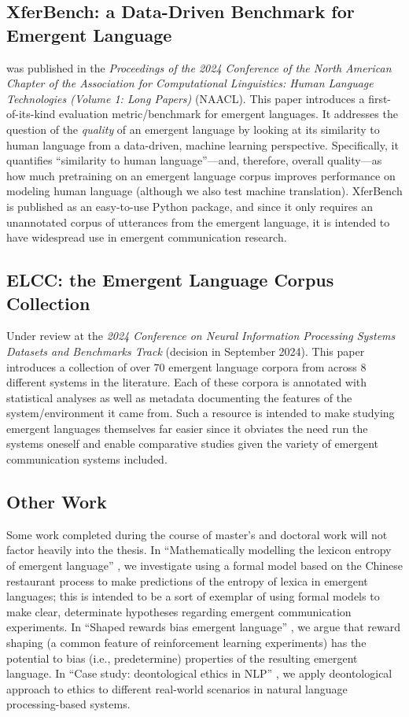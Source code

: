\subsection{XferBench: a Data-Driven Benchmark for Emergent Language}
\noindent
\citet{boldt2024xferbench} was published in the \textit{Proceedings of the 2024 Conference of the North American Chapter of the Association for Computational Linguistics: Human Language Technologies (Volume 1: Long Papers)} (NAACL).
This paper introduces a first-of-its-kind evaluation metric/benchmark for emergent languages.
It addresses the question of the \emph{quality} of an emergent language by looking at its similarity to human language from a data-driven, machine learning perspective.
Specifically, it quantifies ``similarity to human language''---and, therefore, overall quality---as how much pretraining on an emergent language corpus improves performance on modeling human language (although we also test machine translation).
XferBench is published as an easy-to-use Python package, and since it only requires an unannotated corpus of utterances from the emergent language, it is intended to have widespread use in emergent communication research.


\subsection{ELCC: the Emergent Language Corpus Collection}
Under review at the \textit{2024 Conference on Neural Information Processing Systems Datasets and Benchmarks Track} (decision in September 2024).
This paper introduces a collection of over $70$ emergent language corpora from across $8$ different systems in the literature.
Each of these corpora is annotated with statistical analyses as well as metadata documenting the features of the system/environment it came from.
Such a resource is intended to make studying emergent languages themselves far easier since it obviates the need run the systems oneself and enable comparative studies given the variety of emergent communication systems included.

\subsection{Other Work}
Some work completed during the course of master's and doctoral work will not factor heavily into the thesis.
In ``Mathematically modelling the lexicon entropy of emergent language'' \citep{boldt2022mathematically}, we investigate using a formal model based on the Chinese restaurant process to make predictions of the entropy of lexica in emergent languages; this is intended to be a sort of exemplar of using formal models to make clear, determinate hypotheses regarding emergent communication experiments.
In ``Shaped rewards bias emergent language'' \citep{boldt2022shaped}, we argue that reward shaping (a common feature of reinforcement learning experiments) has the potential to bias (i.e., predetermine) properties of the resulting emergent language.
In ``Case study: deontological ethics in NLP'' \citep{prabhumoye-etal-2021-case}, we apply deontological approach to ethics to different real-world scenarios in natural language processing-based systems.



